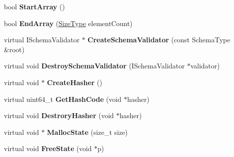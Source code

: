 \begin{DoxyCompactItemize}
\item 
bool {\bfseries Start\+Array} ()\hypertarget{classGenericSchemaValidator_aba13751f802531ed8cbd850778ea993c}{}\label{classGenericSchemaValidator_aba13751f802531ed8cbd850778ea993c}

\item 
bool {\bfseries End\+Array} (\hyperlink{rapidjson_8h_a5ed6e6e67250fadbd041127e6386dcb5}{Size\+Type} element\+Count)\hypertarget{classGenericSchemaValidator_a67b501f0f65d40e0086ca8216882b34f}{}\label{classGenericSchemaValidator_a67b501f0f65d40e0086ca8216882b34f}

\item 
virtual I\+Schema\+Validator $\ast$ {\bfseries Create\+Schema\+Validator} (const Schema\+Type \&root)\hypertarget{classGenericSchemaValidator_af074f9c8f2cfc07e1b3d3f8862e7ef11}{}\label{classGenericSchemaValidator_af074f9c8f2cfc07e1b3d3f8862e7ef11}

\item 
virtual void {\bfseries Destroy\+Schema\+Validator} (I\+Schema\+Validator $\ast$validator)\hypertarget{classGenericSchemaValidator_ae24fa298e328f1fd7dda2ef6267156d2}{}\label{classGenericSchemaValidator_ae24fa298e328f1fd7dda2ef6267156d2}

\item 
virtual void $\ast$ {\bfseries Create\+Hasher} ()\hypertarget{classGenericSchemaValidator_abc377481583ca2095fb784be88887faa}{}\label{classGenericSchemaValidator_abc377481583ca2095fb784be88887faa}

\item 
virtual uint64\+\_\+t {\bfseries Get\+Hash\+Code} (void $\ast$hasher)\hypertarget{classGenericSchemaValidator_ac01c45982a1f512e1ca06fe5544b0c0f}{}\label{classGenericSchemaValidator_ac01c45982a1f512e1ca06fe5544b0c0f}

\item 
virtual void {\bfseries Destrory\+Hasher} (void $\ast$hasher)\hypertarget{classGenericSchemaValidator_a007eef58be575dc562543d069ddd2710}{}\label{classGenericSchemaValidator_a007eef58be575dc562543d069ddd2710}

\item 
virtual void $\ast$ {\bfseries Malloc\+State} (size\+\_\+t size)\hypertarget{classGenericSchemaValidator_a7c999dfb3118aaa08495d60eee6d3732}{}\label{classGenericSchemaValidator_a7c999dfb3118aaa08495d60eee6d3732}

\item 
virtual void {\bfseries Free\+State} (void $\ast$p)\hypertarget{classGenericSchemaValidator_a4e250737a411af2969a9e585a7da4187}{}\label{classGenericSchemaValidator_a4e250737a411af2969a9e585a7da4187}

\end{DoxyCompactItemize}


